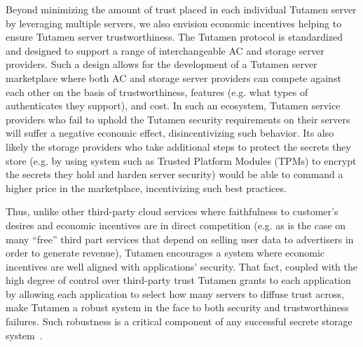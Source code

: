 Beyond minimizing the amount of trust placed in each individual
Tutamen server by leveraging multiple servers, we also envision
economic incentives helping to ensure Tutamen
server trustworthiness. The Tutamen protocol is standardized and
designed to support a range of interchangeable AC and storage server
providers. Such a design allows for the development of a Tutamen
server marketplace where both AC and storage server providers can
compete against each other on the basis of trustworthiness, features
(e.g. what types of authenticates they support), and cost. In such an
ecosystem, Tutamen service providers who fail to uphold the Tutamen
security requirements on their servers will suffer a negative economic
effect, disincentivizing such behavior. Its also likely the storage
providers who take additional steps to protect the secrets they store
(e.g. by using system such as Trusted Platform Modules (TPMs) to
encrypt the secrets they hold and harden server security) would be
able to command a higher price in the marketplace, incentivizing such
best practices.

Thus, unlike other third-party cloud services where faithfulness to
customer's desires and economic incentives are in direct competition
(e.g. as is the case on many ``free'' third part services that depend
on selling user data to advertisers in order to generate revenue),
Tutamen encourages a system where economic incentives are well aligned
with applications' security. That fact, coupled with the high degree
of control over third-party trust Tutamen grants to each application
by allowing each application to select how many servers to diffuse
trust across, make Tutamen a robust system in the face to both
security and trustworthiness failures. Such robustness is a critical
component of any successful secrete storage system~\cite{anderson2001,
  flowerday2006}.



